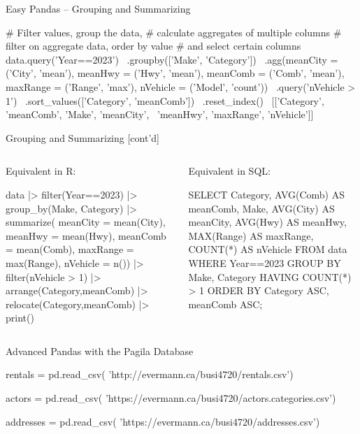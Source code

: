 \documentclass[ignorenonframetext,xcolor=x11names]{beamer}
\begin{document}
\begin{frame}[fragile]{Easy Pandas -- Grouping and Summarizing}
\begin{pythoncode}
# Filter values, group the data,
# calculate aggregates of multiple columns
# filter on aggregate data, order by value
# and select certain columns
data.query('Year==2023') \
    .groupby(['Make', 'Category']) \
    .agg(meanCity = ('City', 'mean'),
         meanHwy = ('Hwy', 'mean'),
         meanComb = ('Comb', 'mean'),
         maxRange = ('Range', 'max'),
         nVehicle = ('Model', 'count')) \
    .query('nVehicle > 1') \
    .sort_values(['Category', 'meanComb']) \
    .reset_index() \
    [['Category', 'meanComb', 'Make', 'meanCity', \
      'meanHwy', 'maxRange', 'nVehicle']]
\end{pythoncode}

\end{frame}
\begin{frame}[fragile]{Grouping and Summarizing \small [cont'd]}
\begin{columns}
\begin{column}{.5\textwidth}
Equivalent in R:
\begin{Rcode}
data |> 
  filter(Year==2023) |> 
  group_by(Make, Category) |>
  summarize(
       meanCity = mean(City), 
       meanHwy = mean(Hwy),
       meanComb = mean(Comb),
       maxRange = max(Range),
       nVehicle = n()) |>
  filter(nVehicle > 1) |>
  arrange(Category,meanComb) |>
  relocate(Category,meanComb) |>
  print()
\end{Rcode}
\end{column}
\begin{column}{.5\textwidth}
Equivalent in SQL:

\begin{sqlcode}
SELECT Category, 
       AVG(Comb) AS meanComb,
       Make,
       AVG(City) AS meanCity,
       AVG(Hwy) AS meanHwy,
       MAX(Range) AS maxRange,
       COUNT(*) AS nVehicle
   FROM data 
   WHERE Year==2023
   GROUP BY Make, Category
   HAVING COUNT(*) > 1
   ORDER BY Category ASC, 
            meanComb ASC;
\end{sqlcode}
\end{column}
\end{columns}
\end{frame}

\begin{frame}[fragile]{Advanced Pandas with the Pagila Database}
\begin{pythoncode}
rentals = pd.read_csv(
     'http://evermann.ca/busi4720/rentals.csv')
     
actors = pd.read_csv(
     'https://evermann.ca/busi4720/actors.categories.csv')
     
addresses = pd.read_csv(
     'https://evermann.ca/busi4720/addresses.csv')
\end{pythoncode}
\end{frame}
\end{document}
